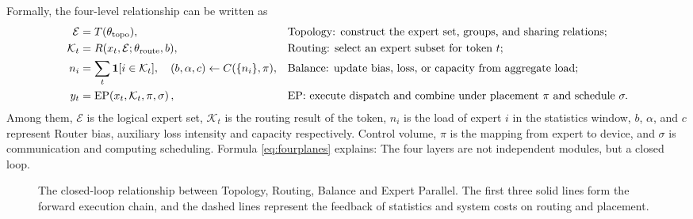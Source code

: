 \documentclass[10pt,a4paper,fontset=none]{ctexart}
\begin{document}
Formally, the four-level relationship can be written as
\begin{align}
  \mathcal{E} &= T(\theta_{\mathrm{topo}}),
  &&\text{Topology: construct the expert set, groups, and sharing relations}; \notag\\
  \mathcal{K}_t &= R(x_t,\mathcal{E};\theta_{\mathrm{route}},b),
  &&\text{Routing: select an expert subset for token }t; \notag\\
  n_i &= \sum_t \mathbf{1}[i\in\mathcal{K}_t],\quad
  (b,\alpha,c)\leftarrow C(\{n_i\},\pi),
  &&\text{Balance: update bias, loss, or capacity from aggregate load}; \notag\\
  y_t &= \operatorname{EP}\!\left(x_t,\mathcal{K}_t,\pi,\sigma\right),
  &&\text{EP: execute dispatch and combine under placement }\pi\text{ and schedule }\sigma.
  \label{eq:fourplanes}
\end{align}
Among them, $\mathcal{E}$ is the logical expert set, $\mathcal{K}_t$ is the routing result of the token, $n_i$ is the load of expert $i$ in the statistics window, $b$, $\alpha$, and $c$ represent Router bias, auxiliary loss intensity and capacity respectively. Control volume, $\pi$ is the mapping from expert to device, and $\sigma$ is communication and computing scheduling. Formula \eqref{eq:fourplanes} explains: The four layers are not independent modules, but a closed loop.

\begin{figure}[htbp]
\centering
{}
\caption{The closed-loop relationship between Topology, Routing, Balance and Expert Parallel. The first three solid lines form the forward execution chain, and the dashed lines represent the feedback of statistics and system costs on routing and placement.}
\label{fig:fourplanes}
\end{figure}
\end{document}
